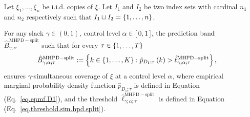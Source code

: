 \documentclass[11pt]{article}
\begin{document}
%
%
%

\begin{corollary}
\label{cor.sim.mhpd.split}
Let $\xi_1, \ldots, \xi_{n}$ be i.i.d. copies of $\xi$.
Let $I_1$ and $I_2$ be two index sets with cardinal $n_1$ and $n_2$ respectively
such that $I_1 \sqcup I_2 = \left\{ 1, \ldots, n \right\}$.

%
%
%

For any slack $\gamma \in (0,1)$, control level $\alpha \in \left[\, 0, 1 \,\right]$,
the prediction band $\hat{B}^{\mathrm{MHPD-split}}_{\gamma; \alpha}$ such that for every $\tau \in \left\{ 1, \ldots, T \right\}$
\begin{align}
    \label{eq.sim.mhpd.split}
    \hat{B}_{\gamma; \alpha; \tau}^{\mathrm{MHPD-split}} :=
    \left\{ 
        k \in \left\{ 1, \ldots, K \right\} :
        \hat{p}_{D_1; \tau} \left( k \right) > \hat{\ell}_{\gamma; \alpha; \tau}^{\mathrm{MHPD-split}}
     \right\},
\end{align}
ensures $\gamma$-simultaneous coverage of $\xi$ at a control level $\alpha$,
where empirical marginal probability density function $\hat{p}_{D_1; \tau}$ is defined in Equation (Eq.~\eqref{eq.epmf.D1}),
and the threshold $\hat{\ell}_{\gamma; \alpha; \tau}^{\mathrm{MHPD-split}}$ is defined in Equation (Eq.~\eqref{eq.threshold.sim.hpd.split}).
\end{corollary}
%
%
%
\end{document}
